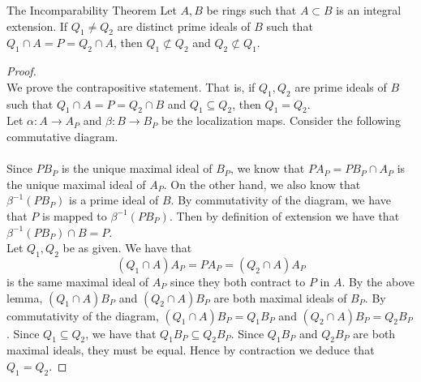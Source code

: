 \documentclass[a4paper]{article}
\begin{document}
\begin{thm}{The Incomparability Theorem}{} Let $A,B$ be rings such that $A\subset B$ is an integral extension. If $Q_1\neq Q_2$ are distinct prime ideals of $B$ such that $Q_1\cap A=P=Q_2\cap A$, then $Q_1\not\subset Q_2$ and $Q_2\not\subset Q_1$. 
\begin{proof}\\
We prove the contrapositive statement. That is, if $Q_1,Q_2$ are prime ideals of $B$ such that $Q_1\cap A=P=Q_2\cap B$ and $Q_1\subseteq Q_2$, then $Q_1=Q_2$. \\

Let $\alpha:A\to A_P$ and $\beta:B\to B_P$ be the localization maps. Consider the following commutative diagram. \\
\\
Since $PB_P$ is the unique maximal ideal of $B_P$, we know that $PA_P=PB_P\cap A_P$ is the unique maximal ideal of $A_P$. On the other hand, we also know that $\beta^{-1}(PB_P)$ is a prime ideal of $B$. By commutativity of the diagram, we have that $P$ is mapped to $\beta^{-1}(PB_P)$. Then by definition of extension we have that $\beta^{-1}(PB_P)\cap B=P$. \\

Let $Q_1,Q_2$ be as given. We have that $$(Q_1\cap A)A_P=PA_P=(Q_2\cap A)A_P$$ is the same maximal ideal of $A_P$ since they both contract to $P$ in $A$. By the above lemma, $(Q_1\cap A)B_P$ and $(Q_2\cap A)B_P$ are both maximal ideals of $B_P$. By commutativity of the diagram, $(Q_1\cap A)B_P=Q_1B_P$ and $(Q_2\cap A)B_P=Q_2B_P$. Since $Q_1\subseteq Q_2$, we have that $Q_1B_P\subseteq Q_2B_P$. Since $Q_1B_P$ and $Q_2B_P$ are both maximal ideals, they must be equal. Hence by contraction we deduce that $Q_1=Q_2$. 
\end{proof}
\end{thm}
\end{document}
